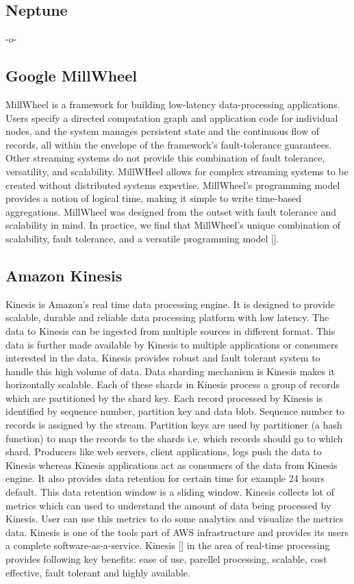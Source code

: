 \subsection{Neptune}

-o-

\subsection{Google MillWheel}

MillWheel is a framework for building low-latency data-processing
applications. Users specify a directed computation graph and
application code for individual nodes, and the system manages
persistent state and the continuous flow of records, all within the
envelope of the framework's fault-tolerance guarantees. Other
streaming systems do not provide this combination of fault tolerance,
versatility, and scalability. MillWHeel allows for complex streaming
systems to be created without distributed systems
expertise. MillWheel's programming model provides a notion of logical
time, making it simple to write time-based aggregations. MillWheel was
designed from the outset with fault tolerance and scalability in
mind. In practice, we find that MillWheel's unique combination of
scalability, fault tolerance, and a versatile programming
model [\cite{millwheel-paper}].

\subsection{Amazon Kinesis}

Kinesis is Amazon's real time data processing engine. It is designed
to provide scalable, durable and reliable data processing platform
with low latency\cite{www-kinesis}.  The data to Kinesis can be
ingested from multiple sources in different format. This data is
further made available by Kinesis to multiple applications or
consumers interested in the data. Kinesis provides robust and fault
tolerant system to handle this high volume of data. Data sharding
mechanism is Kinesis makes it horizontally scalable. Each of these
shards in Kinesis process a group of records which are partitioned by
the shard key. Each record processed by Kinesis is identified by
sequence number, partition key and data blob. Sequence number to
records is assigned by the stream. Partition keys are used by
partitioner (a hash function) to map the records to the shards
i.e. which records should go to which shard. Producers like web
servers, client applications, logs push the data to Kinesis whereas
Kinesis applications act as consumers of the data from Kinesis
engine. It also provides data retention for certain time for example
24 hours default. This data retention window is a sliding
window. Kinesis collects lot of metrics which can used to understand
the amount of data being processed by Kinesis.  User can use this
metrics to do some analytics and visualize the metrics data.  Kinesis
is one of the tools part of AWS infrastructure and provides its users
a complete
software-as-a-service. Kinesis [\cite{big-data-analytics-book}] in the
area of real-time processing provides following key benefits: ease of
use, parellel processing, scalable, cost effective, fault tolerant and
highly available.

